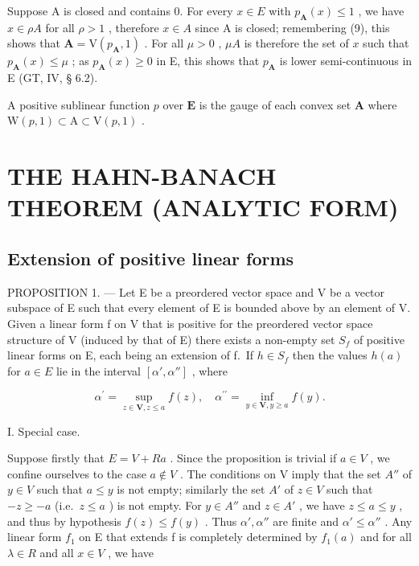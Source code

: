 Suppose A is closed and contains 0. For every \(x \in E\) with \(p_{\mathbf{A}}(x) \leqslant 1\) , we have \(x \in \rho A\) for all \(\rho > 1\) , therefore \(x \in A\) since A is closed; remembering (9), this shows that \(\mathbf{A} = \mathrm{V}(p_{\mathbf{A}}, 1)\) . For all \(\mu > 0\) , \(\mu A\) is therefore the set of \(x\) such that \(p_{\mathbf{A}}(x) \leqslant \mu\) ; as \(p_{\mathbf{A}}(x) \geqslant 0\) in E, this shows that \(p_{\mathbf{A}}\) is lower semi-continuous in E (GT, IV, § 6.2).

A positive sublinear function \(p\) over \(\mathbf{E}\) is the gauge of each convex set \(\mathbf{A}\) where \(\mathrm{W}(p,1)\subset \mathrm{A}\subset \mathrm{V}(p,1)\) .

\section{THE HAHN-BANACH THEOREM (ANALYTIC FORM)}

\subsection{Extension of positive linear forms}

PROPOSITION 1. --- Let E be a preordered vector space and V be a vector subspace of E such that every element of E is bounded above by an element of V. Given a linear form f on V that is positive for the preordered vector space structure of V (induced by that of E) there exists a non-empty set \(S_{f}\) of positive linear forms on E, each being an extension of f.~If \(h \in S_{f}\) then the values \(h(a)\) for \(a \in E\) lie in the interval \([\alpha', \alpha'']\) , where

\[
\alpha^ {\prime} = \sup _ {z \in \mathbf {V}, z \leqslant a} f (z), \quad \alpha^ {\prime \prime} = \inf _ {y \in \mathbf {V}, y \geqslant a} f (y).\tag{1}
\]

I. Special case.

Suppose firstly that \(E = V + R a\) . Since the proposition is trivial if \(a \in V\) , we confine ourselves to the case \(a \notin V\) . The conditions on V imply that the set \(A''\) of \(y \in V\) such that \(a \leqslant y\) is not empty; similarly the set \(A'\) of \(z \in V\) such that \(-z \geqslant -a\) (i.e.~\(z \leqslant a\) ) is not empty. For \(y \in A''\) and \(z \in A'\) , we have \(z \leqslant a \leqslant y\) , and thus by hypothesis \(f(z) \leqslant f(y)\) . Thus \(\alpha', \alpha''\) are finite and \(\alpha' \leqslant \alpha''\) . Any linear form \(f_1\) on E that extends f is completely determined by \(f_1(a)\) and for all \(\lambda \in R\) and all \(x \in V\) , we have

